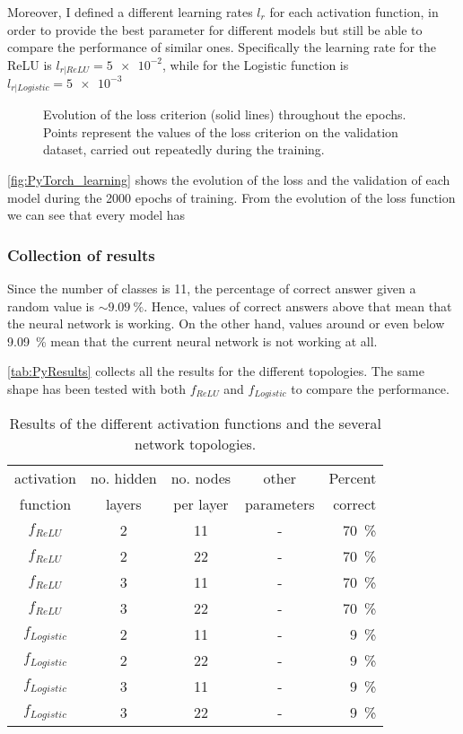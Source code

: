 Moreover, I defined a different learning rates $l_r$ for each activation function, in order to provide the best parameter for different models but still be able to compare the performance of similar ones.
Specifically the learning rate for the \acs{ReLU} is $l_{r|ReLU} = \num{5e-2}$, while for the Logistic function is $l_{r|Logistic}= \num{5e-3}$

\begin{figure}[htbp]
	\centering
	
	\caption{Evolution of the loss criterion (solid lines) throughout the epochs.
		Points represent the values of the loss criterion on the validation dataset, carried out repeatedly during the training.
	}
	\label{fig:PyTorch_learning}
\end{figure}

\autoref{fig:PyTorch_learning} shows the evolution of the loss and the validation of each model during the \num{2000} epochs of training.
From the evolution of the loss function we can see that every model has 


\subsubsection{Collection of results}
Since the number of classes is \num{11}, the percentage of correct answer given a random value is $\sim \SI{9.09}{\percent}$.
Hence, values of correct answers above that mean that the neural network is working.
On the other hand, values around or even below \SI{9.09}{\percent} mean that the current neural network is not working at all.

\autoref{tab:PyResults} collects all the results for the different topologies.
The same shape has been tested with both $f_{ReLU}$ and $f_{Logistic}$ to compare the performance.

\begin{table}[htbp]
	\centering
	\begin{tabular}{c c c c r}
	\toprule
	activation	& no. hidden 	& no. nodes	& other			& Percent\\
	function		& layers 			& per layer	& parameters	& correct\\
	\midrule
	$f_{ReLU}$ 			& 2 & 11 & - & \SI{70}{\percent}\\
	$f_{ReLU}$ 			& 2 & 22 & - & \SI{70}{\percent}\\
	$f_{ReLU}$ 			& 3 & 11 & - & \SI{70}{\percent}\\
	$f_{ReLU}$ 			& 3 & 22 & - & \SI{70}{\percent}\\
	$f_{Logistic}$ 	& 2 & 11 & - & \SI{9}{\percent}\\
	$f_{Logistic}$ 	& 2 & 22 & - & \SI{9}{\percent}\\
	$f_{Logistic}$ 	& 3 & 11 & - & \SI{9}{\percent}\\
	$f_{Logistic}$ 	& 3 & 22 & - & \SI{9}{\percent}\\
	\bottomrule
	\end{tabular}
	\caption{Results of the different activation functions and the several network topologies.
	}
	\label{tab:PyResults}
\end{table}

